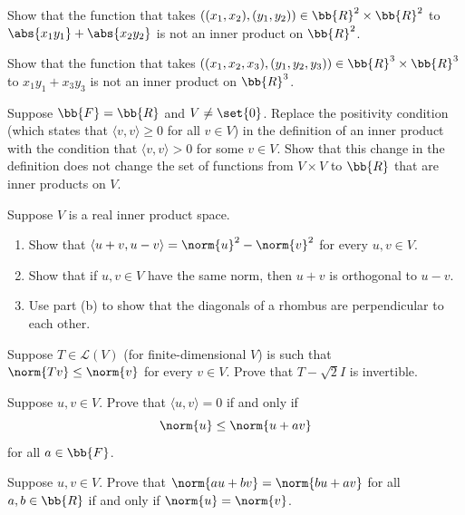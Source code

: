 \documentclass[12pt,letterpaper]{hmcpset}
\begin{document}
\problemlist{}

\begin{problem}[1]
	Show that the function that takes $((x_1, x_2), (y_1, y_2)) \in \bb{R}^2 \times \bb{R}^2$ to $\abs{x_1 y_1} + \abs{x_2 y_2}$ is not an inner product on $\bb{R}^2$.
\end{problem}

\begin{problem}[2]
	Show that the function that takes $((x_1, x_2, x_3), (y_1, y_2, y_3)) \in \bb{R}^3 \times \bb{R}^3$ to $x_1 y_1 + x_3 y_3$ is not an inner product on $\bb{R}^3$. 
\end{problem}

\begin{problem}[3]
	Suppose $\bb{F} = \bb{R}$ and $V \neq \set{0}$. Replace the positivity condition (which states that $\langle v, v \rangle \ge 0$ for all $v \in V$) in the definition of an inner product with the condition that $\langle v, v \rangle > 0$ for some $v \in V$. Show that this change in the definition does not change the set of functions from $V \times V$ to $\bb{R}$ that are inner products on $V$.
\end{problem}

\begin{problem}[4]
	Suppose $V$ is a real inner product space.
	\begin{enumerate}
		\item Show that $\langle u + v, u - v \rangle = \norm{u}^2 - \norm{v}^2$ for every $u, v \in V$.
		\item Show that if $u, v \in V$ have the same norm, then $u + v$ is orthogonal to $u - v$.
		\item Use part (b) to show that the diagonals of a rhombus are perpendicular to each other.
	\end{enumerate}
\end{problem}

\begin{problem}[5]
	Suppose $T \in \mathcal{L}(V)$ (for finite-dimensional $V$) is such that $\norm{Tv} \le \norm{v}$ for every $v \in V$. Prove that $T - \sqrt{2} I$ is invertible.
\end{problem}

\begin{problem}[6]
	Suppose $u, v \in V$. Prove that $\langle u, v \rangle = 0$ if and only if
	\[
		\norm{u} \le \norm{u + av}
	\]
	for all $a \in \bb{F}$.
\end{problem}

\begin{problem}[7]
	Suppose $u, v \in V$. Prove that $\norm{au + bv} = \norm{bu + av}$ for all $a, b \in \bb{R}$ if and only if $\norm{u} = \norm{v}$.
\end{problem}
\end{document}
